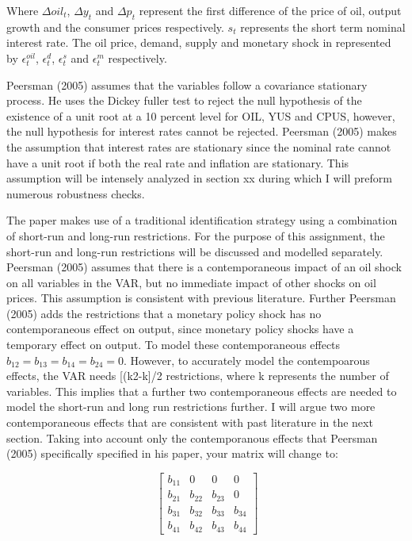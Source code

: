 \documentclass[11pt,preprint, authoryear]{elsarticle}
\numberwithin{equation}{section}
\numberwithin{figure}{section}
\numberwithin{table}{section}
\begin{document}
Where \(\Delta oil_t\), \(\Delta y_t\) and \(\Delta p_t\) represent the
first difference of the price of oil, output growth and the consumer
prices respectively. \(s_t\) represents the short term nominal interest
rate. The oil price, demand, supply and monetary shock in represented by
\(\epsilon_t^{oil}\), \(\epsilon_t^{d}\), \(\epsilon_t^{s}\) and
\(\epsilon_t^{m}\) respectively.

Peersman (2005) assumes that the variables follow a covariance
stationary process. He uses the Dickey fuller test to reject the null
hypothesis of the existence of a unit root at a 10 percent level for
OIL, YUS and CPUS, however, the null hypothesis for interest rates
cannot be rejected. Peersman (2005) makes the assumption that interest
rates are stationary since the nominal rate cannot have a unit root if
both the real rate and inflation are stationary. This assumption will be
intensely analyzed in section xx during which I will preform numerous
robustness checks.

The paper makes use of a traditional identification strategy using a
combination of short-run and long-run restrictions. For the purpose of
this assignment, the short-run and long-run restrictions will be
discussed and modelled separately. Peersman (2005) assumes that there is
a contemporaneous impact of an oil shock on all variables in the VAR,
but no immediate impact of other shocks on oil prices. This assumption
is consistent with previous literature. Further Peersman (2005) adds the
restrictions that a monetary policy shock has no contemporaneous effect
on output, since monetary policy shocks have a temporary effect on
output. To model these contemporaneous effects
\(b_{12} = b_{13} = b_{14} = b_{24} = 0\). However, to accurately model
the contempoarous effects, the VAR needs {[}(k2-k{]}/2 restrictions,
where k represents the number of variables. This implies that a further
two contemporaneous effects are needed to model the short-run and long
run restrictions further. I will argue two more contemporaneous effects
that are consistent with past literature in the next section. Taking
into account only the contemporanous effects that Peersman (2005)
specifically specified in his paper, your matrix will change to:

\[\ \begin{bmatrix} b_{11}& 0 & 0 & 0 \\
b_{21}& b_{22}& b_{23} & 0 \\
b_{31}& b_{32}& b_{33} & b_{34} \\
b_{41}& b_{42}& b_{43} & b_{44} \end{bmatrix} \]
\end{document}
